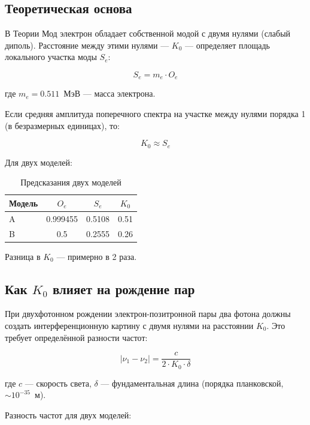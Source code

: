 \documentclass[12pt,a4paper]{article}
\begin{document}
\subsection{Теоретическая основа}
В Теории Мод электрон обладает собственной модой с двумя нулями (слабый диполь). Расстояние между этими нулями — $K_0$ — определяет площадь локального участка моды $S_e$:

\begin{equation}
    S_e = m_e \cdot O_e
\end{equation}

где $m_e = 0.511$~МэВ — масса электрона.

Если средняя амплитуда поперечного спектра на участке между нулями порядка 1 (в безразмерных единицах), то:

\begin{equation}
    K_0 \approx S_e
\end{equation}

Для двух моделей:

\begin{table}[h]
    \centering
    \caption{Предсказания двух моделей}
    \begin{tabular}{lccc}
        \toprule
        Модель & $O_e$ & $S_e$ & $K_0$ \\
        \midrule
        A & 0.999455 & 0.5108 & 0.51 \\
        B & 0.5 & 0.2555 & 0.26 \\
        \bottomrule
    \end{tabular}
    \label{tab:models_exp}
\end{table}

Разница в $K_0$ — примерно в 2 раза.

\subsection{Как $K_0$ влияет на рождение пар}
При двухфотонном рождении электрон-позитронной пары два фотона должны создать интерференционную картину с двумя нулями на расстоянии $K_0$. Это требует определённой разности частот:

\begin{equation}
    |\nu_1 - \nu_2| = \frac{c}{2 \cdot K_0 \cdot \delta}
\end{equation}

где $c$ — скорость света, $\delta$ — фундаментальная длина (порядка планковской, $\sim 10^{-35}$~м).

Разность частот для двух моделей:
\end{document}
